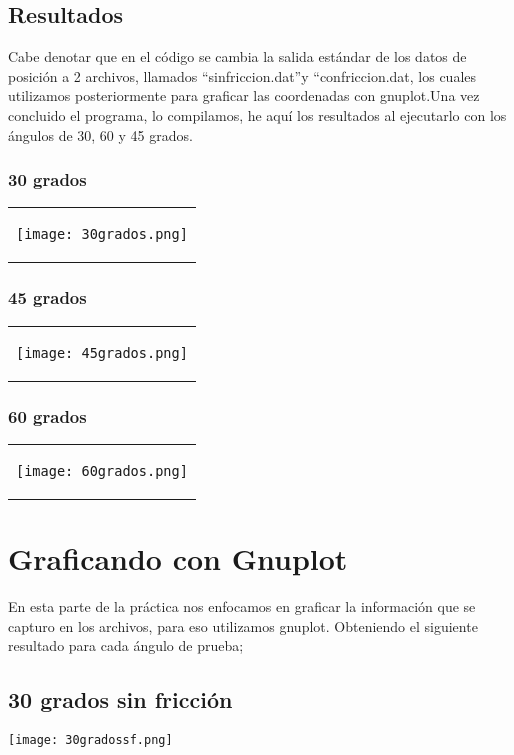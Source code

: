 \documentclass[10pt]{article}
\begin{document}
\newpage
\subsection{Resultados}
Cabe denotar que en el código se cambia la salida estándar de los datos de posición a 2 archivos, llamados ``sinfriccion.dat''y ``confriccion.dat, los cuales utilizamos posteriormente para graficar las coordenadas con gnuplot.Una vez concluido el programa, lo compilamos, he aquí los resultados al ejecutarlo con los ángulos de 30, 60 y 45 grados.

\subsubsection{30 grados}
\begin{tabular}{c}
\begin{center}
   \texttt{[image: 30grados.png]}
\end{center}
\end{tabular}

\subsubsection{45 grados}
\begin{tabular}{c}
\begin{center}
   \texttt{[image: 45grados.png]}
\end{center}
\end{tabular}

\subsubsection{60 grados}
\begin{tabular}{c}
\begin{center}
   \texttt{[image: 60grados.png]}
\end{center}
\end{tabular}




\newpage


\section{Graficando con Gnuplot}
En esta parte de la práctica nos enfocamos en graficar la información que se capturo en los archivos, para eso utilizamos gnuplot.
\space
Obteniendo el siguiente resultado para cada ángulo de prueba;


\subsection{30 grados sin fricción}
\begin{center}
   \texttt{[image: 30gradossf.png]}
\end{center}
\end{document}
